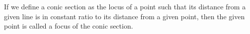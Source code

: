 If we define a conic section as the locus of a point such that its
distance from a given line is in constant ratio to its distance from
a given point, then the given point is called a focus of the conic section.